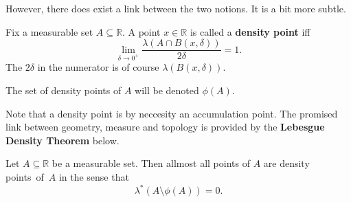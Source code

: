 However, there does exist a link between the two notions. It is a bit more subtle.

\begin{defn}
    Fix a measurable set \( A \subseteq \mathbb{R} \). A point \( x \in \mathbb{R} \) is called a \textbf{density point} iff
    \[ 
        \lim_{\delta \to 0^+} \frac{\lambda(A \cap B(x, \delta))}{2\delta} = 1.
   \]
   The \( 2\delta \) in the numerator is of course \( \lambda(B(x, \delta)) \).
\end{defn}
\begin{defn}
    The set of density points of \( A \) will be denoted \( \phi(A) \).
\end{defn}


Note that a density point is by neccesity an accumulation point. The promised link between geometry, measure and topology is provided by the \textbf{Lebesgue Density Theorem} below.
\begin{thm}\label{LebesgueDensityTheorem}
    Let \( A \subseteq \mathbb{R} \) be a measurable set. Then allmost all points of \( A \) are density points~of~\( A \) in the sense that 
    \[ 
       \lambda^* (A \setminus \phi(A)) = 0. 
   \]
   
\end{thm}
